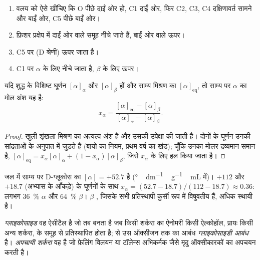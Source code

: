 \begin{method}[फ़िशर से हॉवर्थ तक (D-ऐल्डोपाइरैनोस)]\label{met:b2:biomolecules:haworth}
\begin{enumerate}
  \item वलय को ऐसे खींचिए कि O पीछे दाईं ओर हो, C1 दाईं ओर, फिर C2, C3, C4 दक्षिणावर्त सामने
        और बाईं ओर, C5 पीछे बाईं ओर।
  \item फ़िशर प्रक्षेप में दाईं ओर वाले समूह नीचे जाते हैं, बाईं ओर वाले ऊपर।
  \item C5 पर (D श्रेणी)  ऊपर जाता है।
  \item C1 पर  $\alpha$ के लिए नीचे जाता है, $\beta$ के लिए ऊपर।
\end{enumerate}
\end{method}

\begin{proposition}[परिवर्ती घूर्णन साम्य]\label{prop:b2:biomolecules:mutarotation}
यदि शुद्ध  के विशिष्ट घूर्णन $[\alpha]_\alpha$ और $[\alpha]_\beta$ हों और
साम्य मिश्रण का $[\alpha]_{\mathrm{eq}}$, तो साम्य पर $\alpha$  का मोल अंश
यह है:
\begin{equation*}
x_\alpha = \frac{[\alpha]_{\mathrm{eq}} - [\alpha]_\beta}{[\alpha]_\alpha - [\alpha]_\beta}.
\end{equation*}
\end{proposition}

\begin{proof}
खुली शृंखला मिश्रण का अत्यल्प अंश है और उसकी उपेक्षा की जाती है। दोनों  के घूर्णन
उनकी सांद्रताओं के अनुपात में जुड़ते हैं (बायो का नियम, प्रथम वर्ष का खंड); चूँकि उनका मोलर
द्रव्यमान समान है, $[\alpha]_{\mathrm{eq}} = x_\alpha[\alpha]_\alpha + (1 - x_\alpha)[\alpha]_\beta$, जिसे
$x_\alpha$ के लिए हल किया जाता है।
\end{proof}

जल में साम्य पर D-ग्लूकोस का $[\alpha] = +52.7$ है (\unit{\degree\,dm^{-1}\,g^{-1}\,mL} में)।
$+112$ और $+18.7$ (अभ्यास के आँकड़े) के  घूर्णनों के साथ $x_\alpha = (52.7 - 18.7)/(112 - 18.7)
\approx 0.36$: लगभग 36~\% $\alpha$ और 64~\% $\beta$। $\beta$ , जिसके सभी
प्रतिस्थापी कुर्सी रूप में विषुवतीय हैं, अधिक स्थायी है।

\begin{definition}[ग्लाइकोसाइड]\label{def:b2:biomolecules:glycoside}
\emph{ग्लाइकोसाइड} वह ऐसीटैल है जो तब बनता है जब किसी शर्करा का ऐनोमरी 
किसी ऐल्कोहॉल, प्रायः किसी अन्य शर्करा, के  समूह से प्रतिस्थापित होता है;  से उस
ऑक्सीजन तक का आबंध \emph{ग्लाइकोसाइडी आबंध} है। \emph{अपचायी शर्करा}
वह है जो फ़ेलिंग विलयन या टॉलेन्स अभिकर्मक जैसे मृदु ऑक्सीकारकों का अपचयन करती है।
\end{definition}

